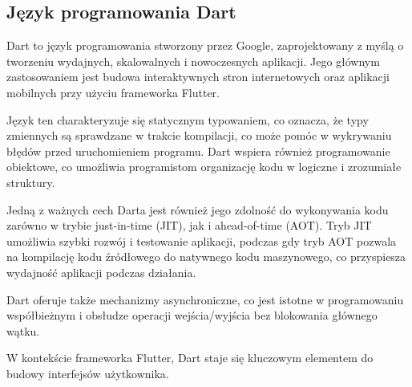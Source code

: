 \documentclass[12pt,twoside]{article}
\begin{document}
\subsection{Język programowania Dart}
{Dart to język programowania stworzony przez Google, zaprojektowany z myślą o tworzeniu wydajnych, skalowalnych i nowoczesnych aplikacji. 
Jego głównym zastosowaniem jest budowa interaktywnych stron internetowych oraz aplikacji mobilnych przy użyciu frameworka Flutter.

Język ten charakteryzuje się statycznym typowaniem, co oznacza, że typy zmiennych są sprawdzane w trakcie kompilacji, co może pomóc 
w wykrywaniu błędów przed uruchomieniem programu. Dart wspiera również programowanie obiektowe,
 co umożliwia programistom organizację kodu w logiczne i zrozumiałe struktury.

Jedną z ważnych cech Darta jest również jego zdolność do wykonywania kodu zarówno w trybie just-in-time (JIT),
 jak i ahead-of-time (AOT). Tryb JIT umożliwia szybki rozwój i testowanie aplikacji, podczas gdy tryb AOT pozwala na kompilację
  kodu źródłowego do natywnego kodu maszynowego, co przyspiesza wydajność aplikacji podczas działania.

Dart oferuje także mechanizmy asynchroniczne, co jest istotne w programowaniu współbieżnym i 
obsłudze operacji wejścia/wyjścia bez blokowania głównego wątku.

W kontekście frameworka Flutter, Dart staje się kluczowym elementem do budowy interfejsów użytkownika. }
\end{document}

